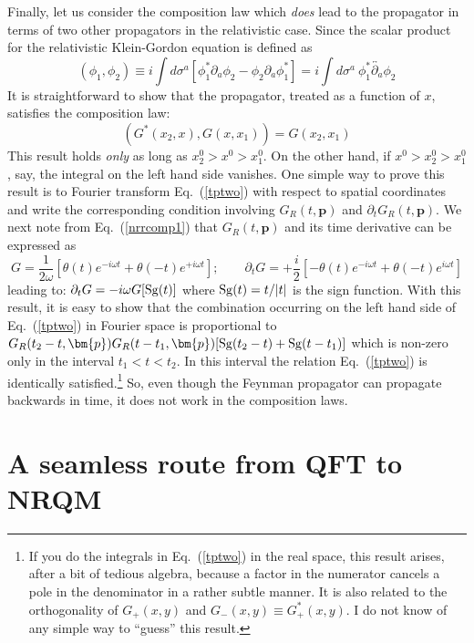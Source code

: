 \documentclass[12pt]{article}
\def\eq#1{{Eq.~(\ref{#1})}}
\begin{document}
Finally, let us consider the composition law which \textit{does} lead to the propagator in terms of two other propagators in the relativistic case. Since the scalar product for the relativistic Klein-Gordon equation is defined as 
\begin{equation}
(\phi_1,\phi_2)\equiv i\int d\sigma^a [\phi_1^*\partial_a\phi_2-\phi_2\partial_a\phi_1^*] = i \int d\sigma^a \ \phi_1^*\overleftrightarrow{\partial_a}\phi_2
\end{equation} 
It is straightforward to show that the propagator, treated as a function of $x$, satisfies the composition law:
\begin{equation}
 (G^*(x_2,x),G(x,x_1))=G(x_2,x_1)
 \label{tptwo}
\end{equation}
This result holds \textit{only} as long as $x_2^0>x^0>x_1^0$. On the other hand, if $x^0>x_2^0 >x_1^0$, say,  the integral on the left hand side vanishes. One simple way to prove this result is to 
Fourier transform \eq{tptwo} with respect to spatial coordinates and write the corresponding condition involving  $G_R(t,\bm{p}) $ and $\partial_t G_R(t,\bm{p}) $. We next note from \eq{nrrcomp1} that $G_R(t,\bm{p}) $ and its time derivative can be expressed as 
\begin{equation}
 G = \frac{1}{2\omega} \left[ \theta(t) e^{-i \omega t} + \theta(-t) e^{+i\omega t}\right]; \qquad 
 \partial_t G = + \frac{i}{2} \left[-\theta(t) e^{-i \omega t} + \theta(-t) e^{i\omega t}\right]
\end{equation} 
leading to:
$
 \partial_t G = - i \omega G[{\rm Sg}(t)]
$ where ${\rm Sg}(t)=t/|t|$ is the sign function. With this result, it is easy to show that the combination occurring on the left hand side of \eq{tptwo} in Fourier space  is proportional to
$G_R(t_2-t,\bm{p})G_R(t-t_1,\bm{p})[{\rm Sg}(t_2-t)+{\rm Sg}(t-t_1)]$
which is non-zero only in the interval 
 $t_1<t<t_2$.
  In this interval the relation \eq{tptwo} is identically satisfied.\footnote{If you do the integrals in \eq{tptwo} in the real space, this result arises, after a bit of tedious algebra, because a factor in the numerator cancels a pole in the denominator in a rather subtle manner. 
 It is also related to the orthogonality of $G_+(x,y)$ and $G_-(x,y) \equiv G_+^*(x,y)$.
 I do not know of any simple way to ``guess'' this result.} So, even though the Feynman propagator can propagate backwards in time, it does not work in the composition laws.

\section{A seamless route  from QFT to NRQM}\label{sec:seamless}
\end{document}
